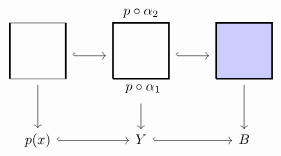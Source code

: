 \begin{center}
    \(
    \begin{tikzcd}
    \begin{tikzpicture}[x=4em, y=4em, baseline=1.4em]
        \draw[very thick, black!30] (0,0)--(1,0)--(1,1)--(0,1)--(0,0);
        \draw[very thick]
        (0,0)--(0,1) (1,0)--(1,1);
    \end{tikzpicture}
    \ar[r, hook]\ar[d]
    & 
    \begin{tikzpicture}[x=4em, y=4em, baseline=1.4em]
        \draw[very thick] (0,0)--(1,0)--(1,1)--(0,1)--(0,0);
        \filldraw 
            (0.54,0) node[anchor=north]{$p\circ\alpha_1$}
            (0.5,1) node[anchor=south]{$p\circ\alpha_2$};
    \end{tikzpicture} 
    \ar[r, hook]\ar[d]
    &
    \begin{tikzpicture}[x=4em, y=4em, baseline=1.4em]
        \filldraw[very thick, fill=blue!20] (0,0)--(1,0)--(1,1)--(0,1)--(0,0);
    \end{tikzpicture}
    \ar[d]\\
    p(x)\ar[r, hook]&Y\ar[r, hook]& B
    \end{tikzcd}
    \)
\end{center}